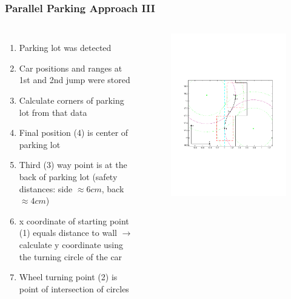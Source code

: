 \documentclass[noshadow]{LSRslides}
\begin{document}
\begin{frame}
\frametitle{Parallel Parking Approach III}
\begin{columns}
\footnotesize
\begin{enumerate}
\item Parking lot was detected
\item Car positions and ranges at 1st and 2nd jump were stored
\item Calculate corners of parking lot from that data
\item Final position (4) is center of parking lot
\item Third (3) way point is at the back of parking lot (safety distances: side $\approx 6cm$, back $\approx 4cm$)
\item x coordinate of starting point (1) equals distance to wall $\rightarrow$ calculate y coordinate using the turning circle of the car
\item Wheel turning point (2) is point of intersection of circles
\end{enumerate}

\begin{figure}
\includegraphics[width = 1\textwidth]{parking_plot.pdf}
\end{figure}

\end{columns}
\end{frame}
\end{document}
